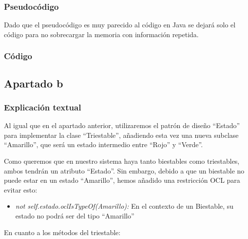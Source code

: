 \documentclass[11pt,a4paper]{article}
\begin{document}
\subsubsection{Pseudocódigo}

Dado que el pseudocódigo es muy parecido al código en Java se dejará solo el código para no sobrecargar la memoria con información repetida.

\subsubsection{Código}









\subsection{Apartado b}

\subsubsection{Explicación textual}

Al igual que en el apartado anterior, utilizaremos el patrón de diseño ``Estado'' para implementar la clase ``Triestable'', añadiendo esta vez una nueva subclase ``Amarillo'', que será un estado intermedio entre ``Rojo'' y ``Verde''.

Como queremos que en nuestro sistema haya tanto biestables como triestables, ambos tendrán un atributo ``Estado''. Sin embargo, debido a que un biestable no puede estar en un estado ``Amarillo'', hemos añadido una restricción OCL para evitar esto:

\begin{itemize}
\item \emph{not self.estado.oclIsTypeOf(Amarillo):} En el contexto de un Biestable, su estado no podrá ser del tipo ``Amarillo''
\end{itemize}


En cuanto a los métodos del triestable:
\end{document}
